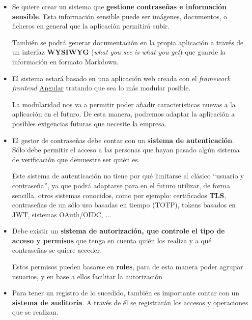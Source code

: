 \documentclass{\ClassPath/viu-tfm-template}
\begin{document}
\begin{itemize}

    \item Se quiere crear un sistema que \textbf{gestione contraseñas e información sensible}. Esta información sensible puede ser imágenes, documentos, o ficheros en general que la aplicación permitirá subir.

    También se podrá generar documentación en la propia aplicación a través de un interfaz \textbf{WYSIWYG} (\textit{what you see is what you get}) que guarde la información en formato Markdown.

    \item El sistema estará basado en una aplicación web creada con el \textit{framework frontend} \href{https://angular.io/}{Angular} tratando que sea lo más modular posible.

    La modularidad nos va a permitir poder añadir características nuevas a la aplicación en el futuro. De esta manera, podremos adaptar la aplicación a posibles exigencias futuras que necesite la empresa.

    \item El gestor de contraseñas debe contar con un \textbf{sistema de autenticación}. Sólo debe permitir el acceso a las personas que hayan pasado algún sistema de verificación que demuestre ser quién es.

    Este sistema de autenticación no tiene por qué limitarse al clásico “usuario y contraseña”, ya que podrá adaptarse para en el futuro utilizar, de forma sencilla, otros sistemas conocidos, como por ejemplo: certificados \textbf{TLS}, contraseñas de un sólo uso basadas en tiempo (TOTP), tokens basados en \href{https://en.wikipedia.org/wiki/JSON_Web_Token}{JWT}, sistemas \href{https://en.wikipedia.org/wiki/OAuth}{OAuth}/\href{https://en.wikipedia.org/wiki/OpenID#OpenID_Connect_(OIDC)}{OIDC}, ...

    \item Debe existir un \textbf{sistema de autorización, que controle el tipo de acceso y permisos} que tenga en cuenta quién los realiza y a qué contraseñas se quiere acceder.

    Estos permisos pueden basarse en \textbf{roles}, para de esta manera poder agrupar usuarios, y en base a ellos facilitar la autorización

    \item Para tener un registro de lo sucedido, también es importante contar con un \textbf{sistema de auditoría}. A través de él se registrarán los accesos y operaciones que se realizan.


\end{itemize}
\end{document}
